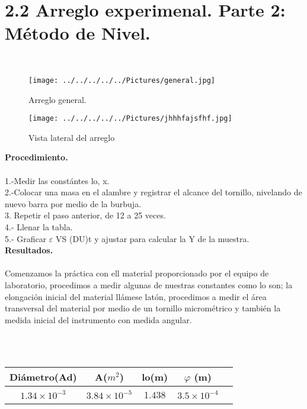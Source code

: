 \documentclass[10pt,a4paper]{article}
\begin{document}
\section*{2.2 Arreglo experimenal. Parte 2: M\'{e}todo de Nivel.} \\

\begin{figure}[hbtp]
\centering
\texttt{[image: ../../../../../Pictures/general.jpg]}  
\caption{Arreglo general.}
\end{figure}

\begin{figure}[hbtp]
\centering
\texttt{[image: ../../../../../Pictures/jhhhfajsfhf.jpg]}  
\caption{Vista lateral del arreglo}
\end{figure}

\pagebreak 

\textbf{Procedimiento.}\\
\\
1.-Medir las const\'{a}ntes lo, x.\\
2.-Colocar una masa en el alambre y registrar el alcance del tornillo, nivelando de nuevo barra por medio de la burbuja.\\
3. Repetir el paso anterior, de 12 a 25 veces.\\
4.- Llenar la tabla.\\
5.- Graficar $\varepsilon$ VS (DU)t y ajustar para calcular la Y de la muestra.\\

\textbf{Resultados.}\\
\\
Comenzamos la pr\'{a}ctica con ell material proporcionado por el equipo de laboratorio, procedimos a medir algunas de nuestras constantes como lo son; la elongaci\'{o}n inicial del material ll\'{a}mese lat\'{o}n, procedimos a medir el \'{a}rea transversal del material por medio de un tornillo microm\'{e}trico y tambi\'{e}n la medida inicial del instrumento con medida angular. \\
\medskip
\\
\medskip
\medskip
\caption{Tabla 1.} 
\\
\begin{tabular}{|c|c|c|c|c|}
\hline 
Di\'{a}metro(Ad) & A(${ m }^{ 2 }$) & lo(m)& $\varphi$ (m)\\ 
\hline 
${ 1.34\times 10 }^{ -3 }$ & ${ 3.84\times 10 }^{ -5 }$ & 1.438 & ${ 3.5\times 10 }^{ -4 }$ \\
\hline 
\end{tabular}\\
\end{document}
